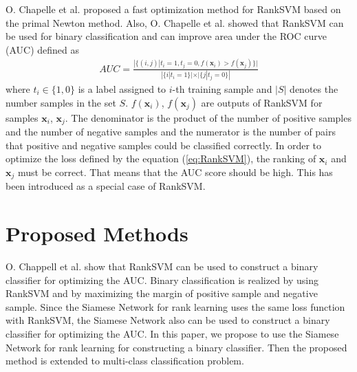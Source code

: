 \documentclass[runningheads,a4paper]{llncs}
\begin{document}
O. Chapelle et al. \cite{ROCAUC} proposed a fast optimization method for RankSVM based on the primal Newton method.
Also, O. Chapelle et al. showed that RankSVM can be used for binary classification and can improve area under the ROC curve (AUC) defined as 
\begin{align} \label{eq:AUC}
    AUC=\frac{|\{(i,j)| t_i=1, t_j=0, f({\bm x}_i) > f({\bm x}_j)\}|}{|\{i|t_i=1\}| \times |\{j|t_j=0\}|}
\end{align}
where $t_i \in \{1,0\}$ is a label assigned to $i$-th training sample and $|S|$ denotes the number samples in the set $S$.
$f({\bm x}_i)$, $f({\bm x}_j)$ are outputs of RankSVM for samples ${\bm x}_i$, ${\bm x}_j$.
The denominator is the product of the number of positive samples and the number of negative samples and the numerator is the number of pairs that positive and negative samples could be classified correctly.
In order to optimize the loss defined by the equation (\ref{eq:RankSVM}), the ranking of ${\bm x_i}$ and ${\bm x_j}$ must be correct.
That means that the AUC score should be high. 
This has been introduced as a special case of RankSVM.

\section{Proposed Methods}
\label{sec:proposedmethods}

O. Chappell et al. \cite{ROCAUC} show that RankSVM can be used to construct a binary classifier for optimizing the AUC.
Binary classification is realized by using RankSVM and by maximizing the margin of positive sample and negative sample. 
Since the Siamese Network for rank learning uses the same loss function with RankSVM,
the Siamese Network also can be used to construct a binary classifier for optimizing the AUC.
In this paper, we propose to use the Siamese Network for rank learning for constructing a binary classifier.
Then the proposed method is extended to multi-class classification problem.
\end{document}
